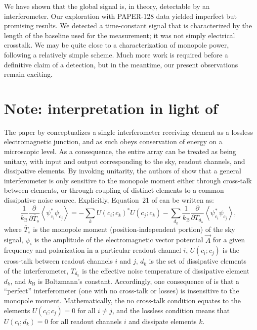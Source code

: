 We have shown that the global signal is, in theory, detectable by an interferometer. Our exploration with PAPER-128 data yielded imperfect but promising results. We detected a time-constant signal that is characterized by the length of the baseline used for the measurement; it was not simply electrical crosstalk. We may be quite close to a characterization of monopole power, following a relatively simple scheme. Much more work is required before a definitive claim of a detection, but in the meantime, our present observations remain exciting.

\section*{Note: interpretation in light of \cite{Venumadhav.16}}
The paper by \citealt{Venumadhav.16} conceptualizes a single
interferometer receiving element as a lossless electromagnetic junction, and as
such obeys conservation of energy on a microscopic level. As a consequence, the
entire array can be treated as being unitary, with input and output
corresponding to the sky, readout channels, and dissipative elements. By
invoking unitarity, the authors of \citealt{Venumadhav.16} show that a general interferometer is
only sensitive to the monopole moment either through cross-talk between
elements, or through coupling of distinct elements to a common dissipative noise
source. Explicitly, Equation~21 of \citealt{Venumadhav.16} can be written as:
\begin{equation}
\frac{1}{k_\mathrm{B}} \frac{\partial}{\partial\bar{T}_s} \left\langle\psi_{c_i}^* \psi_{c_j}\right\rangle =
- \sum_k U(c_i; c_k)^* U(c_j; c_k) - \sum_{d_k} \frac{1}{k_\mathrm{B}} \frac{\partial}{\partial T_{d_k}} \left\langle\psi_{c_i}^* \psi_{c_j}\right\rangle, 
\label{eqn:21V16}
\end{equation}
where ${\bar{T}_s}$ is the monopole moment (position-independent portion) of the
sky signal, $\psi_i$ is the amplitude of the electromagnetic vector potential
$\vec{A}$ for a given frequency and polarization in a particular readout channel
$i$, $U(c_i; c_j)$ is the cross-talk between readout channels $i$ and $j$, $d_k$
is the set of dissipative elements of the interferometer, $T_{d_k}$ is the
effective noise temperature of dissipative element $d_k$, and $k_\mathrm{B}$ is
Boltzmann's constant. Accordingly, one consequence of \citealt{Venumadhav.16} is that a ``perfect''
interferometer (one with no cross-talk or losses) is insensitive to the monopole
moment. Mathematically, the no cross-talk condition equates to the elements
$U(c_i; c_j) = 0$ for all $i \neq j$, and the lossless condition means that
$U(c_i; d_k) = 0$ for all readout channels $i$ and dissipate elements $k$.

